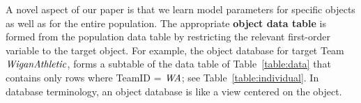 {{\begin{table}[htbp]
				\caption{Sample Object Data Table, for team $\team = \it{WA}$. \label{table:individual}}
		\end{table}
		
		
		
		
		A novel aspect of our paper is that we learn model parameters for specific objects as well as for the entire population. 
		The appropriate \textbf{object data table} is formed from the population data table by restricting the relevant first-order variable to the target object. 
		For example, the object database for target Team $\it{Wigan Athletic}$, 
		forms a subtable of the data table of Table~\ref{table:data} that contains only rows where 
		TeamID = $\it{WA}$; see Table~\ref{table:individual}. In database terminology, an object database is like a view centered on the object.
		
		\begin{table} 


\end{table}}}
